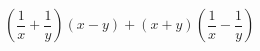 \begin{ex}
	\begin{condition}
		\( \left( \dfrac{1}{x}+\dfrac{1}{y} \right)(x-y)+(x+y)\left( \dfrac{1}{x}-\dfrac{1}{y} \right) \)
	\end{condition}
\end{ex}